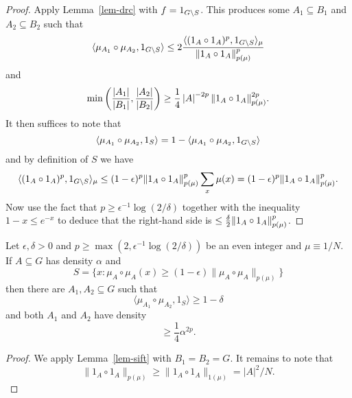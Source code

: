 \begin{proof}
\leanok
Apply Lemma~\ref{lem-drc} with $f=1_{G\backslash S}$. This produces some $A_1\subseteq B_1$ and $A_2\subseteq B_2$ such that
\[\langle \mu_{A_1}\circ \mu_{A_2}, 1_{G\backslash S}\rangle\leq 2\frac{\langle (1_{A}\circ 1_{A})^p,1_{G\backslash S}\rangle_\mu}{\lVert 1_{A}\circ 1_{A}\rVert_{p(\mu)}^p}\]
and
\[\min\left( \frac{\left\lvert A_1\right\rvert}{\left\lvert B_1\right\rvert},\frac{\left\lvert A_2\right\rvert}{\left\lvert B_2\right\rvert}\right)\geq \frac{1}{4}\left\lvert A\right\rvert^{-2p}\lVert 1_{A}\circ 1_{A}\rVert_{p(\mu)}^{2p}.\]
It then suffices to note that
\[\langle \mu_{A_1}\circ \mu_{A_2},1_{S}\rangle=1-\langle \mu_{A_1}\circ \mu_{A_2},1_{G\backslash S}\rangle\]
and by definition of $S$ we have
\[\langle (1_{A}\circ 1_{A})^p,1_{G\backslash S}\rangle_\mu\leq (1-\epsilon)^p\lVert 1_{A}\circ 1_{A}\rVert_{p(\mu)}^p\sum_{x}\mu(x)=(1-\epsilon)^p\lVert 1_{A}\circ 1_{A}\rVert_{p(\mu)}^p.\]
Now use the fact that $p\geq \epsilon^{-1}\log(2/\delta)$ together with the inequality $1-x\leq e^{-x}$ to deduce that the right-hand side is $\leq \tfrac{\delta}{2}\lVert 1_{A}\circ 1_{A}\rVert_{p(\mu)}^p$.
\end{proof}



\begin{corollary}\label{cor_sifting}
Let $\epsilon,\delta>0$ and $p\geq \max(2,\epsilon^{-1}\log(2/\delta))$ be an even integer and $\mu\equiv 1/N$. If $A\subseteq G$ has density $\alpha$ and
\[S = \{ x : \mu_A\circ \mu_A(x) \geq (1-\epsilon)\| \mu_A\circ \mu_A\|_{p(\mu)}\}\]
then there are $A_1,A_2\subseteq G$ such that
\[\langle \mu_{A_1}\circ \mu_{A_2}, 1_S\rangle \geq 1-\delta\]
and both $A_1$ and $A_2$ have density
\[\geq \frac{1}{4}\alpha^{2p}.\]
\end{corollary}
\begin{proof}
We apply Lemma~\ref{lem-sift} with $B_1=B_2=G$. It remains to note that 
\[\| 1_A\circ 1_A\|_{p(\mu)}\geq \| 1_A\circ 1_A\|_{1(\mu)}=\lvert A\rvert^2/N.\]
\end{proof}
